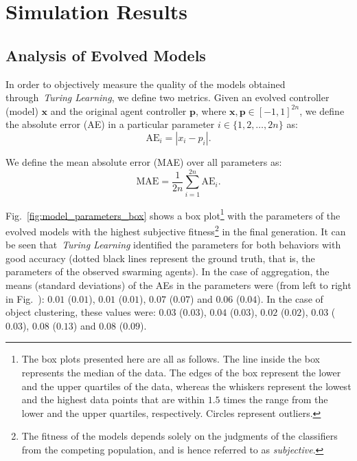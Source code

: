 \section{Simulation Results}\label{sec:results_swarm_simulation}

\subsection{Analysis of Evolved Models}\label{sec:analysis_evolved_models_swarm_simulation}

In order to objectively measure the quality of the models obtained through~\textit{Turing Learning}, we define two metrics. Given an evolved controller (model) $\mathbf{x}$ and the original agent controller $\mathbf{p}$, where $\mathbf{x},\mathbf{p}\in[-1,1]^{2n}$, we define the absolute error (AE) in a particular parameter $i\in\{1,2,\dots,2n\}$ as: 
\begin{equation}\label{eq:AE}
\mathrm{AE}_i = |x_i-p_i|. 
\end{equation}

We define the mean absolute error (MAE) over all parameters as: 
\begin{equation}\label{eq:MAE}
\mathrm{MAE} = \frac{1}{2n}\sum_{i=1}^{2n} \mathrm{AE}_i.
\end{equation}

Fig.~\ref{fig:model_parameters_box} shows a box plot\footnote{The box plots presented here are all as follows. The line inside the box represents the median of the data. The edges of the box represent the lower and the upper quartiles of the data, whereas the whiskers represent the lowest and the highest data points that are within $1.5$ times the range from the lower and the upper quartiles, respectively. Circles represent outliers.\label{fn:boxplot}} with the parameters of the evolved models with the highest subjective fitness\footnote{The fitness of the models depends solely on the judgments of the classifiers from the competing population, and is hence referred to as \textit{subjective}.} in the final generation. It can be seen that~\textit{Turing Learning} identified the parameters for both behaviors with good accuracy (dotted black lines represent the ground truth, that is, the parameters of the observed swarming agents). In the case of aggregation, the means (standard deviations) of the AEs in the parameters were (from left to right in Fig.~): $0.01$ ($0.01$), $0.01$ ($0.01$), $0.07$ ($0.07$) and $0.06$ ($0.04$). In the case of object clustering, these values were: $0.03$ ($0.03$), $0.04$ ($0.03$), $0.02$ ($0.02$), $0.03$ ($0.03$), $0.08$ ($0.13$) and $0.08$ ($0.09$).

